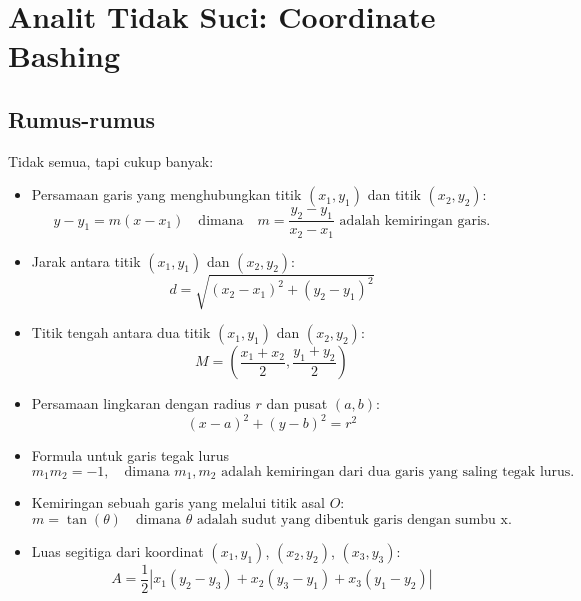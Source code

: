 \documentclass[12pt]{scrartcl}
\begin{document}
\section{Analit Tidak Suci: Coordinate Bashing}
\subsection{Rumus-rumus}
Tidak semua, tapi cukup banyak:
\begin{itemize}
    \item Persamaan garis yang menghubungkan titik $(x_1, y_1)$ dan titik $(x_2, y_2)$:
    \[ y - y_1 = m(x - x_1) \quad \text{dimana} \quad m = \frac{y_2 - y_1}{x_2 - x_1} \text{ adalah kemiringan garis.} \]
    
    \item Jarak antara titik $(x_1, y_1)$ dan $(x_2, y_2)$:
    \[ d = \sqrt{(x_2 - x_1)^2 + (y_2 - y_1)^2} \]
    
    \item Titik tengah antara dua titik $(x_1, y_1)$ dan $(x_2, y_2)$:
    \[ M = \left(\frac{x_1 + x_2}{2}, \frac{y_1 + y_2}{2}\right) \]
    
    \item Persamaan lingkaran dengan radius $r$ dan pusat $(a, b)$:
    \[ (x - a)^2 + (y - b)^2 = r^2 \]
    
    \item Formula untuk garis tegak lurus
    \[ m_1m_2 = -1, \quad \text{dimana } m_1, m_2 \text{ adalah kemiringan dari dua garis yang saling tegak lurus.} \]
    
    \item Kemiringan sebuah garis yang melalui titik asal $O$:
    \[ m = \tan(\theta) \quad \text{dimana } \theta \text{ adalah sudut yang dibentuk garis dengan sumbu x.} \]
    
    \item Luas segitiga dari koordinat $(x_1, y_1)$, $(x_2, y_2)$, $(x_3, y_3)$:
    \[ A = \frac{1}{2} 
    \left| 
    x_1(y_2 - y_3) + x_2(y_3 - y_1) + x_3(y_1 - y_2) 
    \right| \]
\end{itemize}
\end{document}
